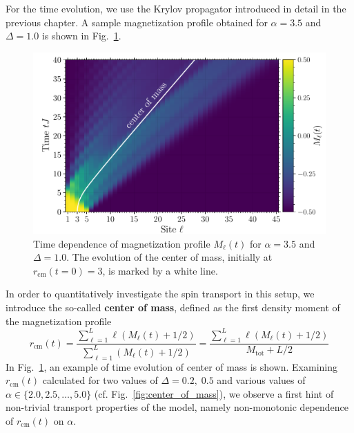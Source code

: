 For the time evolution, we use the Krylov propagator introduced in detail in the previous chapter.
A sample magnetization profile obtained for \(\alpha = 3.5\) and \(\Delta = 1.0\) is shown in
Fig.~\ref{fig:magnetization_profile}.
\begin{figure}[htbp]
  \centering
  \includegraphics[width=0.8\linewidth]{Figures/magnetization.pdf}
  \caption{Time dependence of magnetization profile \(M_{\ell}(t)\) for \(\alpha = 3.5\) and \(\Delta = 1.0\).
    The evolution of the center of mass, initially at \(r_{\text{cm}}(t=0)=3\), is marked by a white line.}
  \label{fig:magnetization_profile}
\end{figure}
In order to quantitatively investigate the spin transport in this setup, we introduce the so-called
\textbf{center of mass}, defined as the first density moment of the magnetization profile
\begin{equation}
  r_{\text{cm}}(t) = \frac{\sum_{\ell=1}^{L} \ell \left(M_{\ell}(t)+1/2\right)}
  {\sum_{\ell=1}^{L} \left(M_{\ell}(t) + 1/2\right)} =
  \frac{\sum_{\ell=1}^{L} \ell \left(M_{\ell}(t)+1/2\right)}
  {M_{\mathrm{tot}} + L/2}
  \label{eq:center_of_mass}
\end{equation}
In Fig.~\ref{fig:magnetization_profile}, an example of time evolution of center of mass is shown. Examining \(r_{\text{cm}}(t)\)
calculated for two values of \(\Delta = 0.2,\;0.5\) and various values of \(\alpha \in \{2.0,2.5,\ldots,5.0\}\)
(cf. Fig.~\ref{fig:center_of_mass}), we observe a first hint of non-trivial transport properties of the model, namely
non-monotonic dependence of \(r_{\text{cm}}(t)\) on \(\alpha\).

